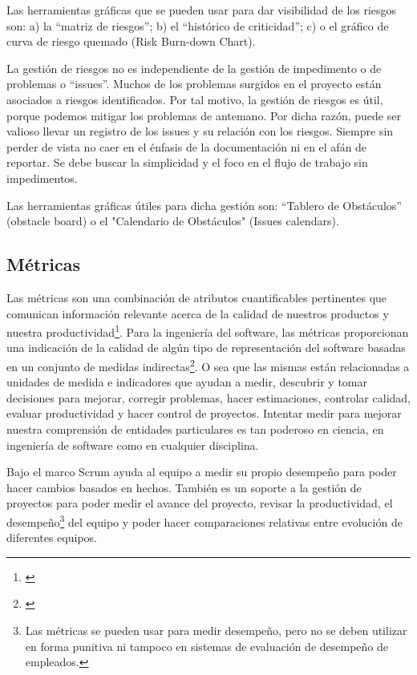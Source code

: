 Las herramientas gráficas que se pueden usar para dar visibilidad de los riesgos son: a) la “matriz de riesgos”; b) el “histórico de criticidad”; c) o el gráfico de curva de riesgo quemado (Risk Burn-down Chart).

La gestión de riesgos no es independiente de la gestión de impedimento o de problemas o “issues”. Muchos de los problemas surgidos en el proyecto están asociados a riesgos identificados. Por tal motivo, la gestión de riesgos es útil, porque podemos mitigar los problemas de antemano. Por dicha razón, puede ser valioso llevar un registro de los issues y su relación con los riesgos. Siempre sin perder de vista no caer en el énfasis de la documentación ni en el afán de reportar. Se debe buscar la simplicidad y el foco en el flujo de trabajo sin impedimentos.

Las herramientas gráficas útiles para dicha gestión son: “Tablero de Obstáculos” (obstacle board) o el "Calendario de Obstáculos" (Issues calendars).


\subsection{Métricas}

Las métricas son una combinación de atributos cuantificables pertinentes que comunican información relevante acerca de la calidad de nuestros productos y nuestra productividad\footnote{\cite{INCOSE-2005}}. Para la ingeniería del software, las métricas proporcionan una indicación de la calidad de algún tipo de representación del software basadas en un conjunto de medidas indirectas\footnote{\cite{Roger-Pressman-2002}}. O sea que las mismas están relacionadas a unidades de medida e indicadores que ayudan a medir, descubrir y tomar decisiones para mejorar, corregir problemas, hacer estimaciones, controlar calidad, evaluar productividad y hacer control de proyectos. Intentar medir para mejorar nuestra comprensión de entidades particulares es tan poderoso en ciencia, en ingeniería de software como en cualquier disciplina.

Bajo el marco Scrum ayuda al equipo a medir su propio desempeño para poder hacer cambios basados en hechos. También es un soporte a la gestión de proyectos para poder medir el avance del proyecto, revisar la productividad, el desempeño\footnote{Las métricas se pueden usar para medir desempeño, pero no se deben utilizar en forma punitiva ni tampoco en sistemas de evaluación de desempeño de empleados.} del equipo y poder hacer comparaciones relativas entre evolución de diferentes equipos. 

